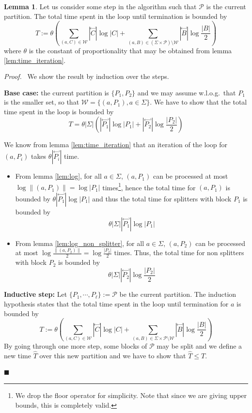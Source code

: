 \documentclass[12pt, a4 paper]{article}
\renewenvironment{proof}[1][Proof]{\begin{mdframed}[backgroundcolor=black!5, topline=false, rightline=false, bottomline=false, linecolor=black!15, linewidth=3pt]{\noindent\textit{#1.}\ }}{\noindent\par\hfill$\blacksquare$\end{mdframed}}
\theoremstyle{definition}
\newtheorem{lemma}{Lemma}
\begin{document}
\begin{lemma}\label{lem:bound}
    Let us consider some step in the algorithm such that $\mathcal{P}$ is the current partition.
    The total time spent in the loop until termination is bounded by
    $$ T := \theta \left(\sum_{(a, C) \in \mathcal{W}} | \overset{\hookleftarrow}{C} | \log | C | + \sum_{(a, B) \in (\Sigma\times \mathcal{P})\setminus \mathcal{W}} | \overset{\hookleftarrow}{B} | \log \frac{| B |}{2} \right)$$
    where $\theta$ is the constant of proportionality that may be obtained from lemma \ref{lem:time_iteration}.
\end{lemma}
\begin{proof}
    We show the result by induction over the steps.

    \bigskip
    \textbf{Base case:} the current partition is $\{P_1, P_2\}$ and we may assume w.l.o.g.\ that $P_1$ is the smaller set, so that $\mathcal{W} = \{(a, P_1), a \in \Sigma\}$.
    We have to show that the total time spent in the loop is bounded by
    $$T = \theta |\Sigma| \left(| \overset{\hookleftarrow}{P_1} | \log | P_1 | + | \overset{\hookleftarrow}{P_2} | \log \frac{| P_2 |}{2}\right)$$
    
    We know from lemma \ref{lem:time_iteration} that an iteration of the loop for $(a, P_i)$ takes $\theta | \overset{\hookleftarrow}{P_i} | $ time.
    \begin{itemize}
        \item From lemma \ref{lem:log}, for all $a\in\Sigma$, $(a, P_1)$ can be processed at most $\log \| (a, P_1) \| = \log |P_1|$ times\footnote{We drop the floor operator for simplicity.
        Note that since we are giving upper bounds, this is completely valid.}, hence the total time for $(a, P_1)$ is bounded by $\theta | \overset{\hookleftarrow}{P_1} | \log | P_1 |$ and thus the total time for splitters with block $P_1$ is bounded by
        $$\theta |\Sigma| | \overset{\hookleftarrow}{P_1} | \log | P_1 |$$

        \item From lemma \ref{lem:log_non_splitter}, for all $a\in\Sigma$, $(a, P_2)$ can be processed at most $\log \frac{\| (a, P_2) \|}{2} = \log \frac{| P_2 |}{2}$ times. Thus, the total time for non splitters with block $P_2$ is bounded by
        $$ \theta |\Sigma| | \overset{\hookleftarrow}{P_2} | \log \frac{| P_2 |}{2}$$
    \end{itemize}
    
    \textbf{Inductive step:} Let $\{P_1, \cdots, P_\ell\} := \mathcal{P}$ be the current partition.
    The induction hypothesis states that the total time spent in the loop until termination for $a$ is bounded by
    $$ T := \theta \left(\sum_{(a, C) \in \mathcal{W}} | \overset{\hookleftarrow}{C} | \log | C | + \sum_{(a, B) \in \Sigma\times \mathcal{P}\setminus \mathcal{W}} | \overset{\hookleftarrow}{B} | \log \frac{| B |}{2} \right)$$
    By going through one more step, some blocks of $\mathcal{P}$ may be split and we define a new time $\hat{T}$ over this new partition and we have to show that $\hat{T} \leq T$.


\end{proof}
\end{document}

